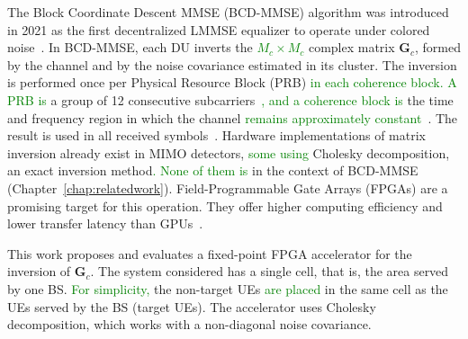 The Block Coordinate Descent
MMSE (BCD-MMSE) algorithm was introduced in 2021 as the first decentralized LMMSE equalizer to operate
under colored noise~\cite{zhao2021-globecom}.
In BCD-MMSE, each DU inverts the \textcolor{GREEN}{$M_c \times M_c$} complex matrix $\mathbf G_c$, formed by the channel and by the noise covariance estimated in its cluster. The inversion is performed once per Physical Resource Block (PRB) \textcolor{GREEN}{in each coherence block. A PRB is} a group of 12 consecutive subcarriers~\cite{3gpp-ts38211}\textcolor{GREEN}{, and a coherence block is} the time and frequency region in which the channel \textcolor{GREEN}{remains approximately constant}~\cite{marzetta2016fundamentals}. The result is used in all received symbols~\cite{zhao2025jsac}.
Hardware implementations of matrix inversion already exist in MIMO detectors, \textcolor{GREEN}{some using} Cholesky decomposition, an exact inversion method\textcolor{GREEN}{. None of them is} in the context of BCD-MMSE (Chapter~\ref{chap:relatedwork}). Field-Programmable Gate Arrays (FPGAs) are
a promising target for this operation. They offer higher computing efficiency and lower transfer latency than GPUs~\cite{jeon2019,li2019cd}.

This work proposes and evaluates a fixed-point FPGA accelerator for the inversion of $\mathbf G_c$. The system considered has a single cell, that is, the area served by one BS. \textcolor{GREEN}{For simplicity,} the non-target UEs \textcolor{GREEN}{are placed} in the same cell as the UEs served by the BS (target UEs). The accelerator uses Cholesky decomposition, which works with a non-diagonal noise covariance.

